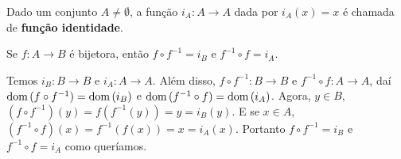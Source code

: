 \begin{definicao}
    Dado um conjunto $A \ne \emptyset$, a função $i_{A}: A \to A$ dada por $i_{A}(x) = x$ é chamada de \textbf{função identidade}.
\end{definicao}

\begin{proposicao}
    Se $f : A \to B$ é bijetora, então $f\circ f^{-1} = i_{B}$ e $f^{-1}\circ f = i_{A}$.
\end{proposicao}
\begin{prova}
    Temos $i_{B} : B \to B$ e $i_{A} : A \to A$. Além disso, $f\circ f^{-1} : B \to B$ e $f^{-1}\circ f : A \to A$, daí ${\rm dom\,}(f\circ f^{-1}) = {\rm dom\,}(i_{B})$ e ${\rm dom\,}(f^{-1}\circ f) = {\rm dom\,}(i_{A})$. Agora, $y \in B$, $(f\circ f^{-1})(y) = f(f^{-1}(y)) = y = i_{B}(y)$. E se $x \in A$, $(f^{-1}\circ f)(x) = f^{-1}(f(x)) = x = i_{A}(x)$. Portanto $f\circ f^{-1} = i_{B}$ e $f^{-1}\circ f = i_{A}$ como queríamos.
\end{prova}

